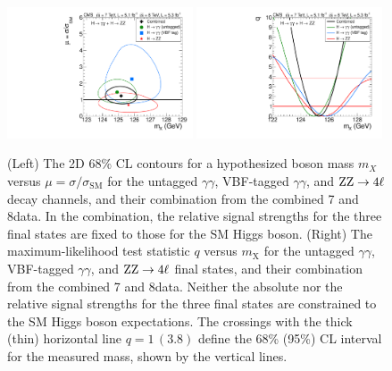 \documentclass[12pt,twoside,a4paper,cmspaper,final,collab]{cms-tdr}
\begin{document}
\begin{figure} [thbp]
\centering
\includegraphics[width=0.49\textwidth]{figures/comb/sqr_mass_scan_2d_all_white} \hfill
\includegraphics[width=0.49\textwidth]{figures/comb/sqr_mass_scan_1d_all}
\caption{
(Left) The 2D 68\% CL contours for a hypothesized boson mass $m_{X}$
   versus $\mu= \sigma / \sigma_{\mathrm{SM}}$  for the untagged $\gamma \gamma$,
   VBF-tagged $\gamma \gamma$, and $\mathrm{Z}\mathrm{Z} \to 4\ell$ decay channels, and their combination from the combined
    7 and 8\TeV data.
   In the combination, the relative signal strengths for the three final states
   are fixed to those for the SM Higgs boson.
(Right) The maximum-likelihood test statistic $q$ versus $m_{\mathrm{X}}$
   for the untagged $\gamma \gamma$, VBF-tagged $\gamma \gamma$, and  $\mathrm{Z}\mathrm{Z} \to 4\ell$ final states,
   and their combination from the combined 7 and 8\TeV data.
   Neither the absolute nor the relative signal strengths for the three final states
   are constrained to the SM Higgs boson expectations.
The crossings with the thick (thin) horizontal line $q=1\,(3.8)$ define the 68\% (95\%) CL interval
for the measured mass, shown by the vertical lines.}

\label{fig:fit_mass}
\end{figure}
\end{document}
